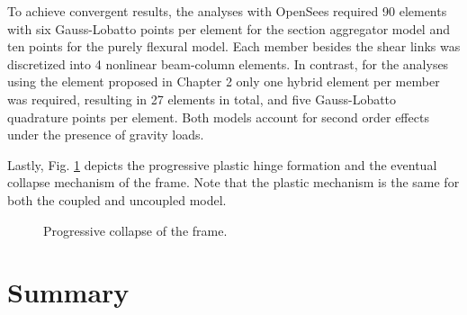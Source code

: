 To 
achieve convergent results, the analyses with OpenSees required 90 elements 
with six Gauss-Lobatto points per element for the section aggregator model and 
ten points for the purely flexural model. Each member besides the shear 
links was discretized into 4 nonlinear beam-column elements. In contrast, for 
the analyses using the element proposed in Chapter 2 only one hybrid element 
per 
member was required, resulting in 27 elements in total, and five Gauss-Lobatto 
quadrature points per 
element. Both models account for second order effects under the presence of 
gravity loads.

Lastly, Fig. \ref{fig:COLLAPSE} depicts the progressive plastic hinge formation 
and the eventual collapse mechanism of the frame. Note that the plastic 
mechanism is the same for both the coupled and uncoupled model.

\begin{figure}[H]
	\centering
	\caption{Progressive collapse of the frame.}
	\label{fig:COLLAPSE}
\end{figure}



\section{Summary}

